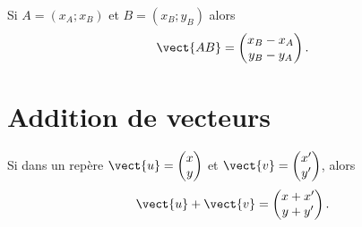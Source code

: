 \begin{Aretenir}
    \begin{multicols}{2}
    Si \( A=(x_A;x_B)\) et \( B=(x_B;y_B)\) alors
    \begin{equation*}
        \vect{ AB }=\begin{pmatrix}
            x_B-x_A    \\ 
            y_B-y_A    
        \end{pmatrix}.
    \end{equation*}

    \columnbreak

    \begin{center}

    \end{center}

    \end{multicols}
\end{Aretenir}

\section{Addition de vecteurs}

\begin{propriete}
    Si dans un repère \( \vect{ u }=\begin{pmatrix}
        x    \\ 
        y    
    \end{pmatrix}\) et \( \vect{ v }=\begin{pmatrix}
        x'    \\ 
        y'    
    \end{pmatrix}\), alors 
    \begin{equation}
        \vect{ u }+\vect{ v }=\begin{pmatrix}
            x+x'    \\ 
            y+y'    
        \end{pmatrix}.
    \end{equation}
    
\end{propriete}

